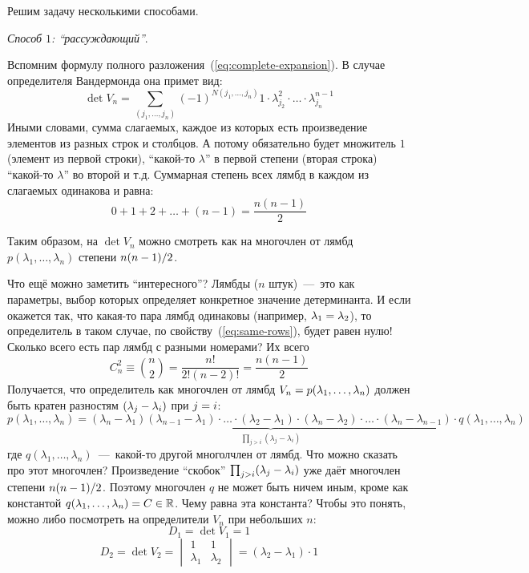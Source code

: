 \documentclass[a4paper,12pt]{article}
\theoremstyle{remark}
\begin{document}
  \begin{solution}
    Решим задачу несколькими способами.
    
    \medskip
    
    \emph{Способ $1$: ``рассуждающий''}.
    
    Вспомним формулу полного разложения~(\ref{eq:complete-expansion}).
    В случае определителя Вандермонда она примет вид:
    \begin{equation}\label{eq:p14-24-7-full-expansion}
      \det V_n = \sum_{(j_1, \ldots, j_n)} (-1)^{N(j_1, \ldots, j_n)} 1 \cdot \lambda_{j_2}^2 \cdot \ldots \cdot \lambda_{j_n}^{n-1}
    \end{equation}
    Иными словами, сумма слагаемых, каждое из которых есть произведение элементов из разных строк и столбцов.
    А потому обязательно будет множитель $1$ (элемент из первой строки), ``какой-то $\lambda$'' в первой степени (вторая строка) ``какой-то $\lambda$'' во второй и т.д.
    Суммарная степень всех лямбд в каждом из слагаемых одинакова и равна:
    \[
      0 + 1 + 2 + \ldots + (n-1) = \frac{n(n-1)}{2}
    \]
    
    Таким образом, на $\det V_n$ можно смотреть как на многочлен от лямбд $p(\lambda_1, \ldots, \lambda_n)$ степени $n(n \hm- 1) \hm/ 2$.
    
    Что ещё можно заметить ``интересного''?
    Лямбды ($n$ штук)~---~это как параметры, выбор которых определяет конкретное значение детерминанта.
    И если окажется так, что какая-то пара лямбд одинаковы (например, $\lambda_1 \hm= \lambda_2$), то определитель в таком случае, по свойству~(\ref{eq:same-rows}), будет равен нулю!
    Сколько всего есть пар лямбд с разными номерами?
    Их всего
    \[
      C_n^2 \equiv \binom{n}{2} = \frac{n!}{2!(n-2)!} = \frac{n(n-1)}{2}
    \]
    Получается, что определитель как многочлен от лямбд $V_n \hm= p(\lambda_1, \ldots, \lambda_n)$ должен быть кратен разностям $(\lambda_j \hm- \lambda_i)$ при $j \hm= i$:
    \[
      p(\lambda_1, \ldots, \lambda_n) = \underbrace{(\lambda_{n} - \lambda_1) (\lambda_{n-1} - \lambda_1) \cdot \ldots \cdot (\lambda_2 - \lambda_1) \cdot (\lambda_{n} - \lambda_2) \cdot \ldots \cdot (\lambda_{n} - \lambda_{n-1})}_{\prod_{j > i} (\lambda_j - \lambda_i)} \cdot q(\lambda_1, \ldots, \lambda_n)
    \]
    где $q(\lambda_1, \ldots, \lambda_n)$~---~какой-то другой многолчлен от лямбд.
    Что можно сказать про этот многочлен?
    Произведение ``скобок'' $\prod_{j > i} (\lambda_j \hm- \lambda_i)$ уже даёт многочлен степени $n(n\hm-1) \hm/ 2$.
    Поэтому многочлен $q$ не может быть ничем иным, кроме как константой $q(\lambda_1, \ldots, \lambda_n) \hm= C \hm\in \RR$.
    Чему равна эта константа?
    Чтобы это понять, можно либо посмотреть на определители $V_n$ при небольших $n$:
    \[
      D_1 = \det V_1 = 1
    \]
    \[
      D_2 = \det V_2 = \begin{vmatrix}
        1         & 1\\
        \lambda_1 & \lambda_2
      \end{vmatrix} = (\lambda_2 - \lambda_1) \cdot 1
    \]
    

\end{solution}
\end{document}
